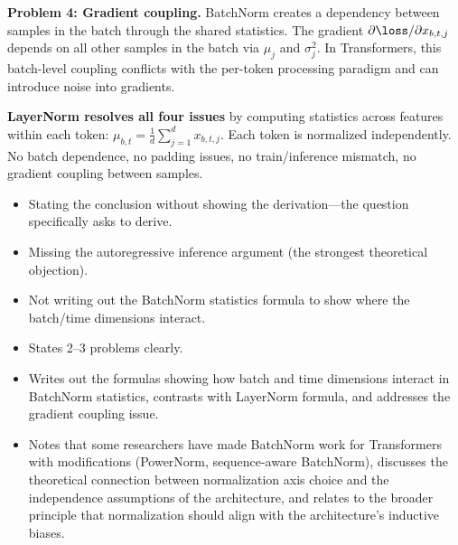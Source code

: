 \begin{interviewq}
\textbf{Problem 4: Gradient coupling.} BatchNorm creates a dependency between samples in the batch through the shared statistics. The gradient $\partial \loss / \partial x_{b,t,j}$ depends on all other samples in the batch via $\mu_j$ and $\sigma_j^2$. In Transformers, this batch-level coupling conflicts with the per-token processing paradigm and can introduce noise into gradients.

\textbf{LayerNorm resolves all four issues} by computing statistics across features within each token: $\mu_{b,t} = \frac{1}{d}\sum_{j=1}^d x_{b,t,j}$. Each token is normalized independently. No batch dependence, no padding issues, no train/inference mismatch, no gradient coupling between samples.

\redflags
\begin{itemize}
    \item Stating the conclusion without showing the derivation---the question specifically asks to derive.
    \item Missing the autoregressive inference argument (the strongest theoretical objection).
    \item Not writing out the BatchNorm statistics formula to show where the batch/time dimensions interact.
\end{itemize}


\goodgreat
\begin{itemize}
    \item {} States 2--3 problems clearly.
    \item {} Writes out the formulas showing how batch and time dimensions interact in BatchNorm statistics, contrasts with LayerNorm formula, and addresses the gradient coupling issue.
    \item {} Notes that some researchers have made BatchNorm work for Transformers with modifications (PowerNorm, sequence-aware BatchNorm), discusses the theoretical connection between normalization axis choice and the independence assumptions of the architecture, and relates to the broader principle that normalization should align with the architecture's inductive biases.
\end{itemize}

\end{interviewq}

